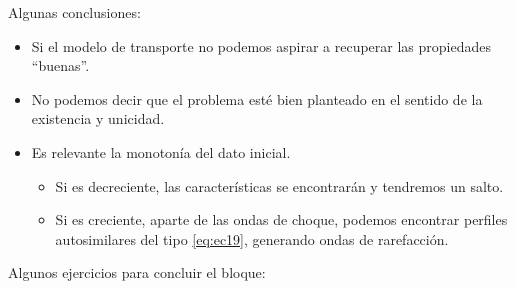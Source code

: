 \begin{observacion}
    Algunas conclusiones:
    \begin{itemize}
        \item Si el modelo de transporte no podemos aspirar a recuperar las propiedades ``buenas''.
        \item No podemos decir que el problema esté bien planteado en el sentido de la existencia y unicidad.
        \item Es relevante la monotonía del dato inicial.
        \begin{itemize}
            \item Si es decreciente, las características se encontrarán y tendremos un salto.
            \item Si es creciente, aparte de las ondas de choque, podemos encontrar perfiles autosimilares del tipo \eqref{eq:ec19}, generando 
            ondas de rarefacción.
        \end{itemize}
    \end{itemize}
\end{observacion}

Algunos ejercicios para concluir el bloque:

